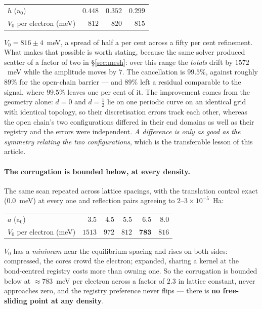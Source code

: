 \documentclass[11pt]{article}
\begin{document}
\begin{center}
\small
\begin{tabular}{@{}lrrr@{}}
\toprule
$h$ (a$_0$) & $0.448$ & $0.352$ & $0.299$\\
$V_0$ per electron (meV) & $812$ & $820$ & $815$\\
\bottomrule
\end{tabular}
\end{center}

\noindent $V_0=816\pm4$~meV, a spread of half a per cent across a fifty per cent refinement. What
makes that possible is worth stating, because the same solver produced scatter of a factor of two
in \S\ref{sec:mesh}: over this range the \emph{totals} drift by $1572$~meV while the amplitude moves
by $7$. The cancellation is $99.5\%$, against roughly $89\%$ for the open-chain barrier --- and
$89\%$ left a residual comparable to the signal, where $99.5\%$ leaves one per cent of it. The
improvement comes from the geometry alone: $d=0$ and $d=\tfrac12$ lie on one periodic curve on an
identical grid with identical topology, so their discretisation errors track each other, whereas the
open chain's two configurations differed in their end domains as well as their registry and the
errors were independent. \emph{A difference is only as good as the symmetry relating the two
configurations}, which is the transferable lesson of this article.

\paragraph{The corrugation is bounded below, at every density.} The same scan repeated across
lattice spacings, with the translation control exact ($0.0$~meV) at every one and reflection pairs
agreeing to $2$--$3\times10^{-5}$~Ha:

\begin{center}
\small
\begin{tabular}{@{}lrrrrr@{}}
\toprule
$a$ (a$_0$) & $3.5$ & $4.5$ & $5.5$ & $6.5$ & $8.0$\\
$V_0$ per electron (meV) & $1513$ & $972$ & $812$ & $\mathbf{783}$ & $816$\\
\bottomrule
\end{tabular}
\end{center}

\noindent $V_0$ has a \emph{minimum} near the equilibrium spacing and rises on both sides:
compressed, the cores crowd the electron; expanded, sharing a kernel at the bond-centred registry
costs more than owning one. So the corrugation is bounded below at ${\approx}783$~meV per electron
across a factor of $2.3$ in lattice constant, never approaches zero, and the registry preference
never flips --- there is \textbf{no free-sliding point at any density}.
\end{document}
